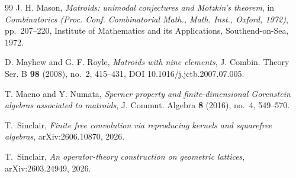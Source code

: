 \documentclass[11pt]{amsart}
\theoremstyle{definition}
\theoremstyle{remark}
\begin{document}
\begin{thebibliography}{99}
J. H. Mason,
\emph{Matroids: unimodal conjectures and Motzkin's theorem},
in \emph{Combinatorics (Proc. Conf. Combinatorial Math., Math. Inst., Oxford, 1972)},
pp.~207--220, Institute of Mathematics and its Applications, Southend-on-Sea, 1972.

D. Mayhew and G. F. Royle,
\emph{Matroids with nine elements},
J. Combin. Theory Ser. B \textbf{98} (2008), no.~2, 415--431,
DOI 10.1016/j.jctb.2007.07.005.

T. Maeno and Y. Numata,
\emph{Sperner property and finite-dimensional Gorenstein algebras associated to matroids},
J. Commut. Algebra \textbf{8} (2016), no.~4, 549--570.

T.~Sinclair,
\emph{Finite free convolution via reproducing kernels and squarefree algebras},
arXiv:2606.10870, 2026.

T.~Sinclair,
\emph{An operator-theory construction on geometric lattices},
arXiv:2603.24949, 2026.

\end{thebibliography}
\end{document}
